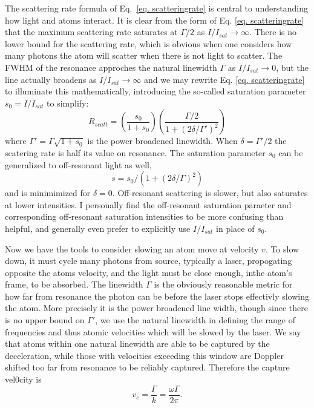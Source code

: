 \documentclass[../../main.tex]{subfiles}
\begin{document}
The scattering rate formula of Eq.~\ref{eq. scatteringrate} is central to understanding how light and atoms interact. It is clear from the form of Eq. \ref{eq. scatteringrate} that the maximum scattering rate saturates at $\Gamma/2$ as $I/I_{sat}\rightarrow \infty$. There is no lower bound for the scattering rate, which is obvious when one considers how many photons the atom will scatter when there is not light to scatter. The FWHM of the resonance approches the natural linewidth $\Gamma$ as $I/I_{sat}\rightarrow 0$, but the line actually broadens as $I/I_{sat}\rightarrow\infty$ and we may rewrite Eq. \ref{eq. scatteringrate} to illuminate this mathematically, introducing the so-called saturation parameter $s_0=I/I_{sat}$ to simplify:
\begin{equation}
    R_{scatt}=\left(\frac{s_0}{1+s_0}\right)\left(\frac{\Gamma/2}{1+(2\delta/\Gamma')^2}\right)
\end{equation}
where $\Gamma'=\Gamma\sqrt{1+s_0}$ is the power broadened linewidth. When $\delta=\Gamma'/2$ the scatering rate is half its value on resonance. The saturation parameter $s_0$ can be generalized to off-resonant light as well, $$s=s_0/(1+(2\delta/\Gamma)^2)$$ and is minimimized for $\delta=0$. Off-resonant scattering is slower, but also saturates at lower intensities. I personally find the off-resonant saturation paraeter and corresponding off-resonant saturation intensities to be more confusing than helpful, and generally even prefer to explicitly use $I/I_{sat}$ in place of $s_0$.

Now we have the tools to consider slowing an atom move at velocity $v$. To slow down, it must cycle many photons from source, typically a laser, propogating opposite the atoms velocity, and the light must be close enough, inthe atom's frame, to be absorbed. The linewidth $\Gamma$ is the obviously reasonable metric for how far from resonance the photon can be before the laser stops effectivly slowing the atom. More precisely it is the power broadened line width, though since there is no upper bound on $\Gamma'$, we use the natural linewidth in defining the range of frequencies and thus atomic velocities which will be slowed by the laser. We say that atoms within one natural linewidth are able to be captured by the deceleration, while those with velocities exceeding this window are Doppler shifted too far from resonance to be reliably captured. Therefore the capture vel0city is 
\begin{equation}\label{eq. capture velocity}
    v_c=\frac{\Gamma}{k}=\frac{\omega\Gamma}{2\pi}.
\end{equation}
\end{document}

